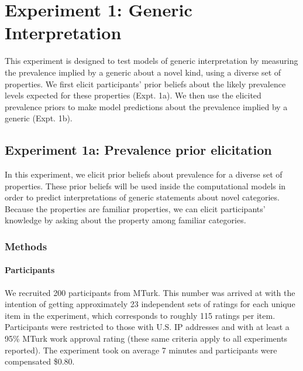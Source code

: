 \documentclass[floatsintext,doc]{apa6}
\let\oldparagraph\paragraph
\renewcommand{\paragraph}[1]{\oldparagraph{#1}\mbox{}}
\begin{document}


\hypertarget{experiment-1}{%
\section{Experiment 1: Generic Interpretation}\label{experiment-1}}

This experiment is designed to test models of generic interpretation by measuring the prevalence implied by a generic about a novel kind, using a diverse set of properties.
We first elicit participants' prior beliefs about the likely prevalence levels expected for these properties (Expt. 1a).
We then use the elicited prevalence priors to make model predictions about the prevalence implied by a generic (Expt. 1b).

\hypertarget{experiment-1a-prevalence-prior-elicitation}{%
\subsection{Experiment 1a: Prevalence prior elicitation}\label{experiment-1a-prevalence-prior-elicitation}}

In this experiment, we elicit prior beliefs about prevalence for a diverse set of properties.
These prior beliefs will be used inside the computational models in order to predict interpretations of generic statements about novel categories. %
Because the properties are familiar properties, we can elicit participants' knowledge by asking about the property among familiar  categories.

\hypertarget{methods}{%
\subsubsection{Methods}\label{methods}}

\hypertarget{participants-1}{%
\paragraph{Participants}\label{participants-1}}

We recruited 200 participants from MTurk.
This number was arrived at with the intention of getting approximately 23 independent sets of ratings for each unique item in the experiment, which corresponds to roughly 115 ratings per item.
Participants were restricted to those with U.S. IP addresses and with at least a 95\% MTurk work approval rating (these same criteria apply to all experiments reported).
The experiment took on average 7 minutes and participants were compensated \$0.80.
\end{document}
